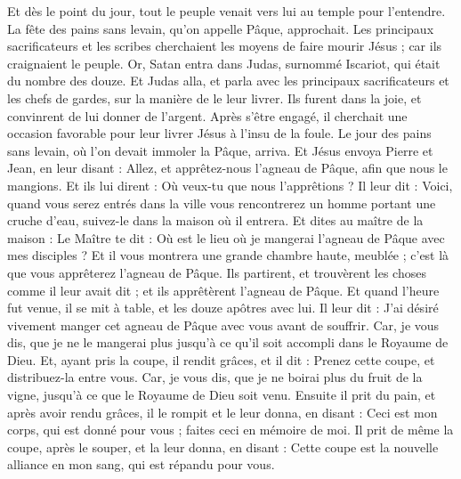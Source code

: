 \begin{multicols}{2}
Et dès le point du jour, tout le peuple venait vers lui au temple pour l'entendre.
\VerseOne{}La fête des pains sans levain, qu'on appelle Pâque, approchait.
Les principaux sacrificateurs et les scribes cherchaient les moyens de faire mourir Jésus ; car ils craignaient le peuple.
Or, Satan entra dans Judas, surnommé Iscariot, qui était du nombre des douze.
Et Judas alla, et parla avec les principaux sacrificateurs et les chefs de gardes, sur la manière de le leur livrer.
Ils furent dans la joie, et convinrent de lui donner de l'argent.
Après s’être engagé, il cherchait une occasion favorable pour leur livrer Jésus à l’insu de la foule.
Le jour des pains sans levain, où l’on devait immoler la Pâque, arriva.
Et Jésus envoya Pierre et Jean, en leur disant : Allez, et apprêtez-nous l'agneau de Pâque, afin que nous le mangions.
Et ils lui dirent : Où veux-tu que nous l'apprêtions ?
Il leur dit : Voici, quand vous serez entrés dans la ville vous rencontrerez un homme portant une cruche d'eau, suivez-le dans la maison où il entrera.
Et dites au maître de la maison : Le Maître te dit : Où est le lieu où je mangerai l'agneau de Pâque avec mes disciples ?
Et il vous montrera une grande chambre haute, meublée ; c’est là que vous apprêterez l'agneau de Pâque.
Ils partirent, et trouvèrent les choses comme il leur avait dit ; et ils apprêtèrent l'agneau de Pâque.
Et quand l'heure fut venue, il se mit à table, et les douze apôtres avec lui.
Il leur dit : J'ai désiré vivement manger cet agneau de Pâque avec vous avant de souffrir.
Car, je vous dis, que je ne le mangerai plus jusqu'à ce qu'il soit accompli dans le Royaume de Dieu.
Et, ayant pris la coupe, il rendit grâces, et il dit : Prenez cette coupe, et distribuez-la entre vous.
Car, je vous dis, que je ne boirai plus du fruit de la vigne, jusqu'à ce que le Royaume de Dieu soit venu.
Ensuite il prit du pain, et après avoir rendu grâces, il le rompit et le leur donna, en disant : Ceci est mon corps, qui est donné pour vous ; faites ceci en mémoire de moi.
Il prit de même la coupe, après le souper, et la leur donna, en disant : Cette coupe est la nouvelle alliance en mon sang, qui est répandu pour vous.

\end{multicols}
